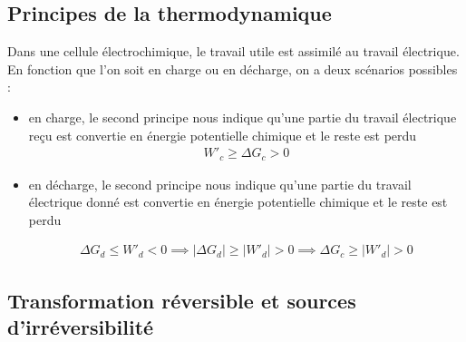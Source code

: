 \subsection{Principes de la thermodynamique}


Dans une cellule électrochimique, le travail utile est assimilé au travail électrique. En fonction que l'on soit en charge ou en décharge, on a deux scénarios possibles : 
\begin{itemize}
\item en charge, le second principe nous indique qu'une partie du travail électrique reçu est convertie en énergie potentielle chimique et le reste est perdu
\begin{align*}
W'_c \geq \Delta G_c > 0
\end{align*}

\item en décharge, le second principe nous indique qu'une partie du travail électrique donné est convertie en énergie potentielle chimique et le reste est perdu

\begin{align*}
\Delta G_d \leq W'_d < 0 \implies \lvert \Delta G_d \rvert \geq \lvert W'_d \rvert > 0 \implies \Delta G_c \geq \lvert W'_d \rvert > 0
\end{align*}

\end{itemize}

\subsection{Transformation réversible et sources d'irréversibilité}

